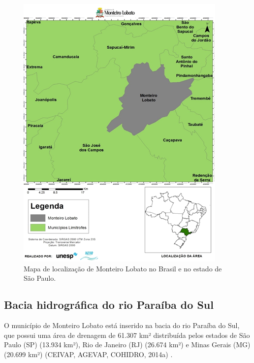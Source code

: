 \begin{figure}[h!]
	\centering
	\includegraphics[width=0.9\linewidth]{produtos/proddois/image17}
	\caption{Mapa de localização de Monteiro Lobato no Brasil e no estado de São Paulo. }
	\label{fig:image17}
\end{figure}

\subsection{Bacia hidrográfica do rio Paraíba do Sul}
O município de Monteiro Lobato está inserido na bacia do rio Paraíba do Sul, que possui uma área de drenagem de 61.307 km² distribuída pelos estados de São Paulo (SP) (13.934 km²), Rio de Janeiro (RJ) (26.674 km²) e Minas Gerais (MG) (20.699 km²) (CEIVAP, AGEVAP, COHIDRO, 2014a) . 

